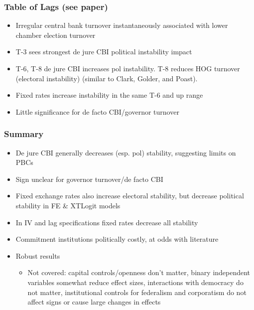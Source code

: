 \documentclass[]{beamer}
\begin{document}
    \begin{frame}
        \frametitle{Table of Lags (see paper)}
        \begin{itemize}
            \item Irregular central bank turnover instantaneously associated with lower chamber election turnover
            \item T-3 sees strongest de jure CBI political instability impact
            \item T-6, T-8 de jure CBI increases pol instability. T-8 reduces HOG turnover (electoral instability) (similar to Clark, Golder, and Poast).
            \item Fixed rates increase instability in the same T-6 and up range
            \item Little significance for de facto CBI/governor turnover
        \end{itemize}
    \end{frame}


    \begin{frame}
        \frametitle{Summary}
        \begin{itemize}
            \item De jure CBI generally decreases (esp. pol) stability, suggesting limits on PBCs
            \item Sign unclear for governor turnover/de facto CBI
            \item Fixed exchange rates also increase electoral stability, but decrease political stability in FE \& XTLogit models
            \item In IV and lag specifications fixed rates decrease all stability
            \item Commitment institutions politically costly, at odds with literature
            \item Robust results
            \begin{itemize}
                \item Not covered: capital controls/openness don’t matter, binary independent variables somewhat reduce effect sizes, interactions with democracy do not matter, institutional controls for federalism and corporatism do not affect signs or cause large changes in effects
            \end{itemize}
        \end{itemize}
    \end{frame}
\end{document}
